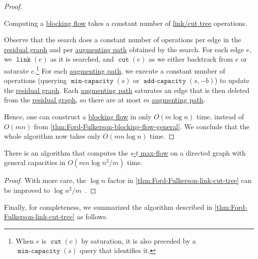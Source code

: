 \begin{proof}
	\begin{claim}
		Computing a \hyperref[def:blocking-flow]{blocking flow} takes a constant number of \hyperref[def:link-cut-tree]{link/cut tree} operations.
	\end{claim}
	\begin{explanation}
		Observe that the search does a constant number of operations per edge in the \hyperref[def:residual-graph]{residual graph} and per \hyperref[def:augmenting-path]{augmenting path} obtained by the search. For each edge \(e\), we \(\operatorname{\texttt{link}} (e)\) as it is searched, and \(\operatorname{\texttt{cut}} (e)\) as we either backtrack from \(e\) or saturate \(e\).\footnote{When \(e\) is \(\operatorname{\texttt{cut}} (e)\) by saturation, it is also preceded by a \(\operatorname{\texttt{min-capacity}} (s)\) query that identifies it.} For each \hyperref[def:augmenting-path]{augmenting path}, we execute a constant number of operations (querying \(\operatorname{\texttt{min-capacity}} (s)\) or \(\operatorname{\texttt{add-capacity}} (s, -b)\)) to update the \hyperref[def:residual-graph]{residual graph}. Each \hyperref[def:augmenting-path]{augmenting path} saturates an edge that is then deleted from the \hyperref[def:residual-graph]{residual graph}, so there are at most \(m\) \hyperref[def:augmenting-path]{augmenting path}.
	\end{explanation}

	Hence, one can construct a \hyperref[def:blocking-flow]{blocking flow} in only \(O(m \log n)\) time, instead of \(O(mn)\) from \autoref{thm:Ford-Fulkerson-blocking-flow-general}. We conclude that the whole algorithm now takes only \(O(mn \log n)\) time.
\end{proof}

\begin{corollary}\label{col:Ford-Fulkerson-link-cut-tree}
	There is an algorithm that computes the \hyperref[prb:s-t-max-flow]{\(s\)-\(t\) max-flow} on a directed graph with general capacities in \(O(mn \log n^2 / m)\) time.
\end{corollary}
\begin{proof}
	With more care, the \(\log n\) factor in \autoref{thm:Ford-Fulkerson-link-cut-tree} can be improved to \(\log n^2 / m\)~\cite{goldberg1990finding}.
\end{proof}

Finally, for completeness, we summarized the algorithm described in \autoref{thm:Ford-Fulkerson-link-cut-tree} as follows.

